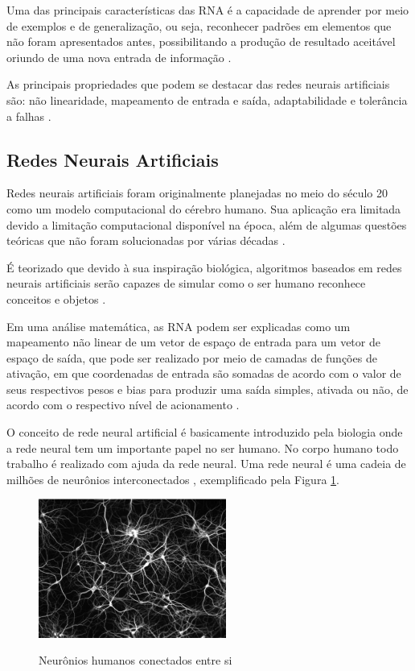 Uma das principais características das RNA é a capacidade de aprender por meio de exemplos e de generalização, ou seja, reconhecer padrões em elementos que não foram apresentados antes, possibilitando a produção de resultado aceitável oriundo de uma nova entrada de informação \cite{neural-network}.

As principais propriedades que podem se destacar das redes neurais artificiais são: não linearidade, mapeamento de entrada e saída, adaptabilidade e tolerância a falhas \cite{neural-network}.

\subsection{Redes Neurais Artificiais}

Redes neurais artificiais foram originalmente planejadas no meio do século 20 como um modelo computacional do cérebro humano. Sua aplicação era limitada devido a limitação computacional disponível na época, além de algumas questões teóricas que não foram solucionadas por várias décadas \cite{mlpp}.

É teorizado que devido à sua inspiração biológica, algoritmos baseados em redes neurais artificiais serão capazes de simular como o ser humano reconhece conceitos e objetos \cite{learning-algorithms}.

Em uma análise matemática, as RNA podem ser explicadas como um mapeamento não linear de um vetor de espaço de entrada para um vetor de espaço de saída, que pode ser realizado por meio de camadas de funções de ativação, em que coordenadas de entrada são somadas de acordo com o valor de seus respectivos pesos e bias  para produzir uma saída simples, ativada ou não, de acordo com o respectivo nível de acionamento \cite{two-phase-flow}.

O conceito de rede neural artificial é basicamente introduzido pela biologia onde a rede neural tem um importante papel no ser humano. No corpo humano todo trabalho é realizado com ajuda da rede neural. Uma rede neural é uma cadeia de milhões de neurônios interconectados \cite{ann}, exemplificado pela Figura \ref{fig:neuronios}.

\begin{figure}[h]
    \caption{Neurônios humanos conectados entre si}
    \centering
    \includegraphics[width=0.55\textwidth]{Textuais/Figuras/neuronios.png}
    \label{fig:neuronios}
\end{figure}

